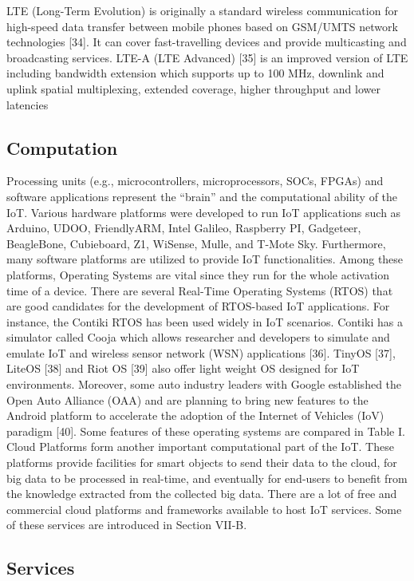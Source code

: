 LTE (Long-Term Evolution) is originally a standard wireless
communication for high-speed data transfer between mobile
phones based on GSM/UMTS network technologies [34]. It
can cover fast-travelling devices and provide multicasting and
broadcasting services. LTE-A (LTE Advanced) [35] is an improved
version of LTE including bandwidth extension which
supports up to 100 MHz, downlink and uplink spatial multiplexing,
extended coverage, higher throughput and lower latencies

\subsection{Computation}

Processing units (e.g., microcontrollers, microprocessors,
SOCs, FPGAs) and software applications represent the “brain”
and the computational ability of the IoT. Various hardware platforms
were developed to run IoT applications such as Arduino,
UDOO, FriendlyARM, Intel Galileo, Raspberry PI, Gadgeteer,
BeagleBone, Cubieboard, Z1, WiSense, Mulle, and T-Mote Sky.
Furthermore, many software platforms are utilized to provide
IoT functionalities. Among these platforms, Operating Systems
are vital since they run for the whole activation time of a
device. There are several Real-Time Operating Systems (RTOS)
that are good candidates for the development of RTOS-based IoT
applications. For instance, the Contiki RTOS has been used
widely in IoT scenarios. Contiki has a simulator called Cooja
which allows researcher and developers to simulate and emulate
IoT and wireless sensor network (WSN) applications [36].
TinyOS [37], LiteOS [38] and Riot OS [39] also offer light
weight OS designed for IoT environments. Moreover, some
auto industry leaders with Google established the Open Auto
Alliance (OAA) and are planning to bring new features to the
Android platform to accelerate the adoption of the Internet of
Vehicles (IoV) paradigm [40]. Some features of these operating
systems are compared in Table I.
Cloud Platforms form another important computational part
of the IoT. These platforms provide facilities for smart objects
to send their data to the cloud, for big data to be processed
in real-time, and eventually for end-users to benefit from the
knowledge extracted from the collected big data. There are a
lot of free and commercial cloud platforms and frameworks
available to host IoT services. Some of these services are
introduced in Section VII-B.

\subsection{Services}

